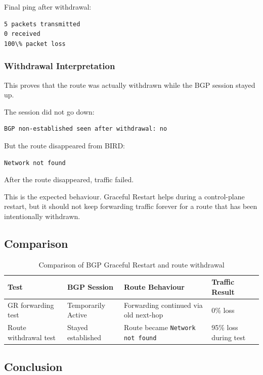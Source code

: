 Final ping after withdrawal:

\begin{verbatim}
5 packets transmitted
0 received
100\% packet loss
\end{verbatim}

\subsubsection{Withdrawal Interpretation}

This proves that the route was actually withdrawn while the BGP session stayed up.

The session did not go down:

\begin{verbatim}
BGP non-established seen after withdrawal: no
\end{verbatim}

But the route disappeared from BIRD:

\begin{verbatim}
Network not found
\end{verbatim}

After the route disappeared, traffic failed.

This is the expected behaviour. Graceful Restart helps during a control-plane restart, but it should not keep forwarding traffic forever for a route that has been intentionally withdrawn.

\subsection{Comparison}

\begin{table}[h]
\centering
\scriptsize
\renewcommand{\arraystretch}{1.25}
\begin{tabular}{|p{3cm}|p{3cm}|p{4.6cm}|p{3.2cm}|}
\hline
\textbf{Test} & \textbf{BGP Session} & \textbf{Route Behaviour} & \textbf{Traffic Result} \\
\hline
GR forwarding test & Temporarily Active & Forwarding continued via old next-hop & 0\% loss \\
\hline
Route withdrawal test & Stayed established & Route became \texttt{Network not found} & 95\% loss during test \\
\hline
\end{tabular}
\caption{Comparison of BGP Graceful Restart and route withdrawal}
\end{table}

\subsection{Conclusion}

